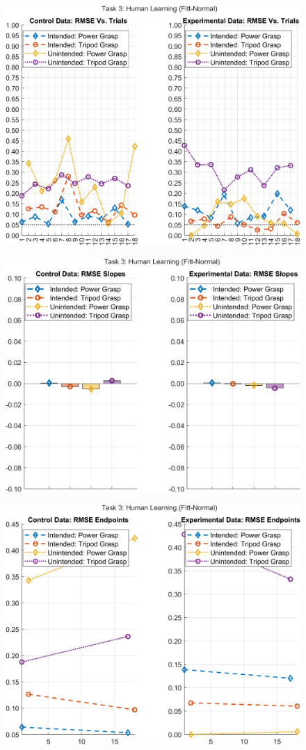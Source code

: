 \documentclass[12pt]{article}
\newcommand\figWidth{7in}
\begin{document}
\begin{figure}
    \includegraphics[width = \figWidth]{t3-rmse-fnorm.png}
\end{figure}
\begin{figure}
    \includegraphics[width = \figWidth]{t3-bar-fnorm.png}
\end{figure}
\begin{figure}
    \includegraphics[width = \figWidth]{t3-spaghetti-fnorm.png}
\end{figure}
\end{document}
